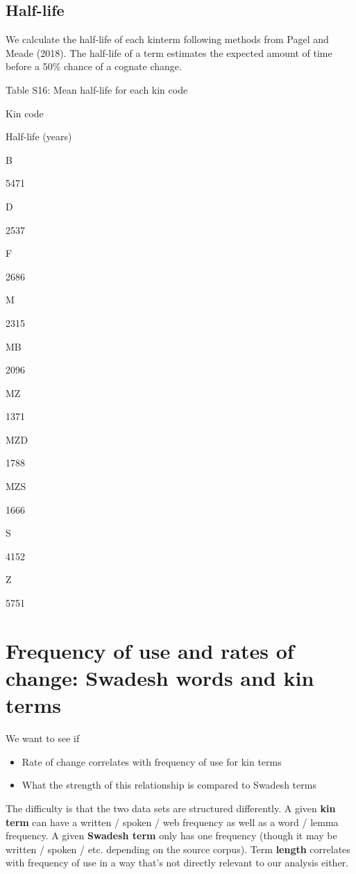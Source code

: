 \documentclass[]{article}
\providecommand{\tightlist}{%
  \setlength{\itemsep}{0pt}\setlength{\parskip}{0pt}}
\begin{document}
\subsection{Half-life}\label{half-life}

We calculate the half-life of each kinterm following methods from Pagel
and Meade (2018). The half-life of a term estimates the expected amount
of time before a 50\% chance of a cognate change.

Table S16: Mean half-life for each kin code

Kin code

Half-life (years)

B

5471

D

2537

F

2686

M

2315

MB

2096

MZ

1371

MZD

1788

MZS

1666

S

4152

Z

5751

\section{Frequency of use and rates of change: Swadesh words and kin
terms}\label{frequency-of-use-and-rates-of-change-swadesh-words-and-kin-terms}

We want to see if

\begin{itemize}
\tightlist
\item
  Rate of change correlates with frequency of use for kin terms
\item
  What the strength of this relationship is compared to Swadesh terms
\end{itemize}

The difficulty is that the two data sets are structured differently. A
given \textbf{kin term} can have a written / spoken / web frequency as
well as a word / lemma frequency. A given \textbf{Swadesh term} only has
one frequency (though it may be written / spoken / etc. depending on the
source corpus). Term \textbf{length} correlates with frequency of use in
a way that's not directly relevant to our analysis either.
\end{document}

